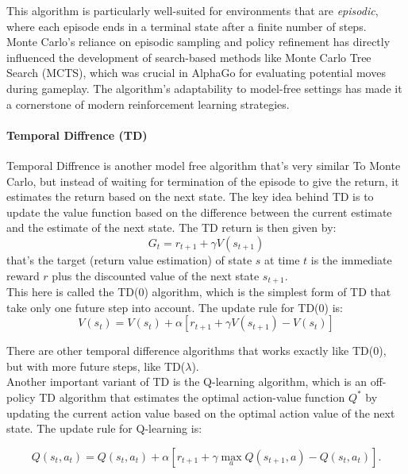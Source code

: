 This algorithm is particularly well-suited for environments that are
\emph{episodic}, where each episode ends in a terminal state after a finite
number of steps. \\ Monte Carlo's reliance on episodic sampling and policy
refinement has directly influenced the development of search-based methods like
Monte Carlo Tree Search (MCTS), which was crucial in AlphaGo for evaluating
potential moves during gameplay. The algorithm's adaptability to model-free
settings has made it a cornerstone of modern reinforcement learning strategies.

\paragraph{Temporal Diffrence (TD)}

Temporal Diffrence is another model free algorithm that's very similar To Monte
Carlo, but instead of waiting for termination of the episode to give the
return, it estimates the return based on the next state. The key idea behind TD
is to update the value function based on the difference between the current
estimate and the estimate of the next state. The TD return is then given by:
\begin{equation}
    G_t = r_{t+1} + \gamma V(s_{t+1})
\end{equation}
that's the target (return value estimation) of state $s$ at time $t$ is the immediate reward $r$ plus the
discounted value of the next state $s_{t+1}$.\\
This here is called the TD(0) algorithm, which is the simplest form of TD
that take only one future step into account. The update rule for TD(0) is:
\begin{equation}
    V(s_t) = V(s_t) + \alpha [r_{t+1} + \gamma V(s_{t+1}) - V(s_t)]
\end{equation}

There are other temporal difference algorithms that works exactly like TD(0),
but with more future steps, like TD($\lambda$). \\

Another important variant of TD is the Q-learning algorithm, which is an
off-policy TD algorithm that estimates the optimal action-value function $Q^*$
by updating the current action value based on the optimal action value of the
next state. The update rule for Q-learning is:

\begin{equation}
    Q(s_t, a_t) = Q(s_t, a_t) + \alpha[r_{t+1} + \gamma \max_a Q(s_{t+1}, a) - Q(s_t, a_t)] .
\end{equation}

